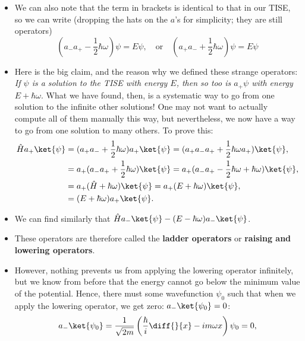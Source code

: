 \begin{itemize}
    \item We can also note that the term in brackets is identical to that in our TISE, so we can write (dropping the hats on the $a$'s for simplicity; they are still operators)
        \begin{equation*}
            \left( a_-a_+ - \frac{1}{2}\hbar\omega \right)\psi = E\psi, \quad \mathrm{or} \quad \left( a_+a_- + \frac{1}{2}\hbar\omega \right)\psi = E\psi
        \end{equation*}
    \item Here is the big claim, and the reason why we defined these strange operators: \textit{If $\psi$ is a solution to the TISE with energy $E$, then so too is $a_+\psi$ with energy $E+\hbar\omega$}. What we have found, then, is a systematic way to go from one solution to the infinite other solutions! One may not want to actually compute all of them manually this way, but nevertheless, we now have a way to go from one solution to many others. To prove this:
        \begin{align*}
            \hat{H} a_+ \ket{\psi} &= (a_+a_- + \frac{1}{2}\hbar\omega)a_+ \ket{\psi} = (a_+a_-a_+ + \frac{1}{2}\hbar\omega a_+) \ket{\psi}, \\
            &= a_+ (a_-a_+ + \frac{1}{2}\hbar\omega)\ket{\psi} = a_+(a_-a_+ - \frac{1}{2}\hbar\omega + \hbar\omega) \ket{\psi}, \\
            &= a_+(\hat{H} + \hbar\omega) \ket{\psi} = a_+(E + \hbar\omega) \ket{\psi}, \\
            &= (E+\hbar\omega)a_+ \ket{\psi}.
        \end{align*}
    \item We can find similarly that $\hat{H}a_-\ket{\psi} - (E-\hbar\omega)a_-\ket{\psi}$.
    \item These operators are therefore called the \textbf{ladder operators} or \textbf{raising and lowering operators}.
    \item However, nothing prevents us from applying the lowering operator infinitely, but we know from before that the energy cannot go below the minimum value of the potential. Hence, there must some wavefunction $\psi_0$ such that when we apply the lowering operator, we get zero: $a_-\ket{\psi_0} = 0$:
        \begin{equation*}
            a_-\ket{\psi_0} = \frac{1}{\sqrt{2m}}\left( \frac{\hbar}{i} \diff{}{x} - im\omega x \right)\psi_0 = 0,
        \end{equation*}
        \begin{align*}

\end{align*}
\end{itemize}
